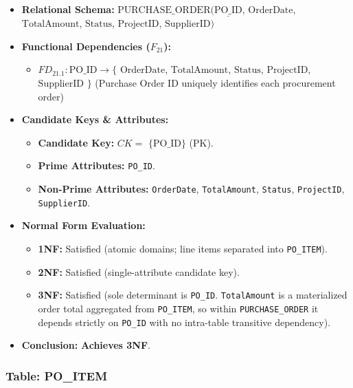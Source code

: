 \documentclass[a4paper,12pt]{report}
\providecommand{\tightlist}{%
  \setlength{\itemsep}{0pt}\setlength{\parskip}{0pt}}
\begin{document}
\begin{itemize}
\item
  \textbf{Relational Schema:} \(\text{PURCHASE\_ORDER}(\underline{\text{PO\_ID}}\), \(\text{OrderDate}\), \(\text{TotalAmount}\), \(\text{Status}\), \(\text{ProjectID}\), \(\text{SupplierID})\)
\item
  \textbf{Functional Dependencies (\(F_{21}\)):}

  \begin{itemize}
  \tightlist
  \item
    \(FD_{21.1}: \text{PO\_ID} \rightarrow \{\) \(\text{OrderDate}\), \(\text{TotalAmount}\), \(\text{Status}\), \(\text{ProjectID}\), \(\text{SupplierID}\) \(\}\) (Purchase Order ID uniquely identifies each procurement order)
  \end{itemize}
\item
  \textbf{Candidate Keys \& Attributes:}

  \begin{itemize}
  \item
    \textbf{Candidate Key:} \(CK =\) \(\{\text{PO\_ID}\}\) (PK).
  \item
    \textbf{Prime Attributes:} \texttt{PO\_\allowbreak{}ID}.
  \item
    \textbf{Non-Prime Attributes:} \texttt{OrderDate}, \texttt{TotalAmount}, \texttt{Status}, \texttt{ProjectID}, \texttt{SupplierID}.
  \end{itemize}
\item
  \textbf{Normal Form Evaluation:}

  \begin{itemize}
  \item
    \textbf{1NF:} Satisfied (atomic domains; line items separated into \texttt{PO\_\allowbreak{}ITEM}).
  \item
    \textbf{2NF:} Satisfied (single-attribute candidate key).
  \item
    \textbf{3NF:} Satisfied (sole determinant is \texttt{PO\_\allowbreak{}ID}. \texttt{TotalAmount} is a materialized order total aggregated from \texttt{PO\_\allowbreak{}ITEM}, so within \texttt{PURCHASE\_\allowbreak{}ORDER} it depends strictly on \texttt{PO\_\allowbreak{}ID} with no intra-table transitive dependency).
  \end{itemize}
\item
  \textbf{Conclusion:} \textbf{Achieves 3NF}.
\end{itemize}

\subsubsection{\texorpdfstring{Table: PO\_\allowbreak{}ITEM}{Table: POITEM}}\label{table-po_item}
\end{document}
